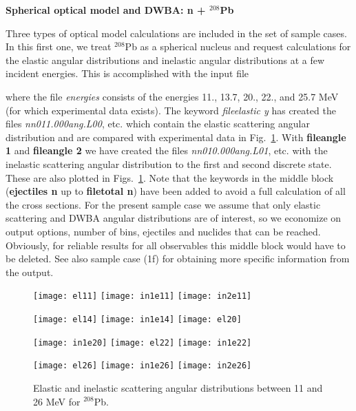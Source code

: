 \begin{samplecase}
{\bf Spherical optical model and DWBA: n + ${}^{208}$Pb}\newline

Three types of optical model calculations are included in the set of sample
cases. In this first one, we treat ${}^{208}$Pb as a spherical nucleus and
request calculations for the elastic angular
distributions and inelastic angular distributions at a few incident energies.
This is accomplished with the input file


where the file {\em energies} consists of the energies 11., 13.7, 20., 22.,
and 25.7 MeV (for which experimental data exists). The keyword
{\em fileelastic y} has created the files {\em nn011.000ang.L00}, etc. which
contain the elastic scattering angular distribution and are compared with
experimental data in Fig.~\ref{pbdwba}.
With {\bf fileangle 1} and {\bf fileangle 2} we have created the files
{\em nn010.000ang.L01}, etc.  with the inelastic scattering angular
distribution to the first and second discrete state.
These are also plotted in Figs.~\ref{pbdwba}.
Note that the keywords in the middle block ({\bf ejectiles n} up to
{\bf filetotal n}) have been added to avoid a full calculation of all the
cross sections. For the present sample case we assume that only elastic
scattering and DWBA angular distributions are
of interest, so we economize on output options, number of bins, ejectiles and
nuclides that can be reached. Obviously, for reliable results for all
observables this middle block would have to be deleted.
See also sample case (1f) for obtaining more specific information from the
output.

\end{samplecase}
\begin{figure}
\centerline{
\centering\texttt{[image: el11]} \centering\texttt{[image: in1e11]} \centering\texttt{[image: in2e11]}
}
\centerline{
\centering\texttt{[image: el14]} \centering\texttt{[image: in1e14]} \centering\texttt{[image: el20]}
}
\centerline{
\centering\texttt{[image: in1e20]} \centering\texttt{[image: el22]} \centering\texttt{[image: in1e22]}
}
\centerline{
\centering\texttt{[image: el26]} \centering\texttt{[image: in1e26]} \centering\texttt{[image: in2e26]}
}
\caption{Elastic and inelastic scattering angular distributions between
11 and 26 MeV for ${}^{208}$Pb.}
\label{pbdwba}
\end{figure}
